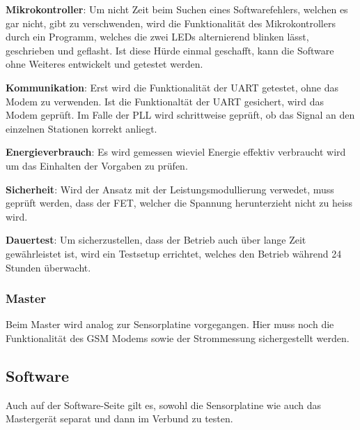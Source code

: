 \textbf{Mikrokontroller}: Um  nicht Zeit  beim  Suchen eines  Softwarefehlers,
welchen  es gar nicht, gibt  zu  verschwenden, wird  die Funktionalit\"at  des
Mikrokontrollers  durch  ein  Programm,  welches die  zwei  LEDs  alternierend
blinken l\"asst, geschrieben und geflasht. Ist diese H\"urde einmal geschafft,
kann die Software ohne Weiteres entwickelt und getestet werden.

\textbf{Kommunikation}: Erst wird die Funktionalit\"at der UART getestet, ohne
das Modem zu  verwenden. Ist die Funktionalt\"at der UART  gesichert, wird das
Modem gepr\"uft. Im Falle  der PLL wird schrittweise gepr\"uft,  ob das Signal
an den einzelnen Stationen korrekt anliegt.

\textbf{Energieverbrauch}: Es   wird   gemessen   wieviel   Energie   effektiv
verbraucht wird um das Einhalten der Vorgaben zu pr\"ufen.

\textbf{Sicherheit}: Wird der  Ansatz mit der  Leistungsmodullierung verwedet,
muss gepr\"uft werden, dass der  FET, welcher die Spannung herunterzieht nicht
zu heiss wird.

\textbf{Dauertest}: Um  sicherzustellen, dass  der Betrieb  auch \"uber  lange
Zeit gew\"ahrleistet  ist, wird ein  Testsetup errichtet, welches  den Betrieb
w\"ahrend 24 Stunden \"uberwacht.


\subsubsection{Master}

Beim  Master wird  analog zur  Sensorplatine vorgegangen. Hier  muss noch  die
Funktionalit\"at des GSM Modems sowie der Strommessung sichergestellt werden.


\subsection{Software}

Auch auf  der Software-Seite gilt  es, sowohl  die Sensorplatine wie  auch das
Masterger\"at separat und dann im Verbund zu testen.



